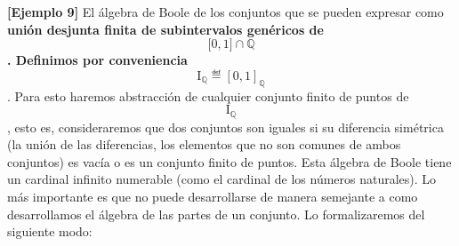   \textbf{{[}Ejemplo 9{]}} El álgebra de Boole de los conjuntos que se
  pueden expresar como \textbf{unión des\-junta finita de subintervalos
  genéricos de \[\lbrack 0,1\rbrack \cap \mathbb{Q}\]. Definimos por
  conveniencia
  \[\mathbf{\mathrm{I}}_{\mathbb{Q}} ≝ \left\lbrack {0,1} \right\rbrack_{\mathbb{Q}}\]}.
  Para esto haremos abs\-tracción de cualquier conjunto finito de puntos
  de \textbf{\[\mathbf{\mathrm{I}}_{\mathbb{Q}}\]}, esto es,
  consideraremos que dos conjuntos son iguales si su diferencia
  simétrica (la unión de las diferencias, los elementos que no son
  comunes de ambos conjuntos) es vacía o es un conjunto finito de
  puntos. Esta álgebra de Boole tiene un cardinal infinito numerable
  (como el cardinal de los números naturales). Lo más importante es que
  no puede desarrollarse de manera semejante a como desarrolla\-mos el
  álgebra de las partes de un conjunto. Lo formalizaremos del siguiente
  modo:

